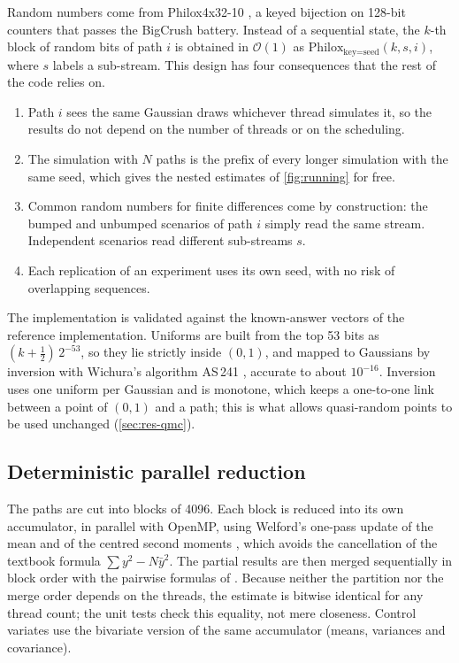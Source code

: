 \documentclass[11pt,a4paper]{article}
\newcommand{\1}{\mathbf{1}}
\theoremstyle{plain}
\theoremstyle{remark}
\begin{document}
Random numbers come from Philox4x32-10 \citep{salmon2011}, a keyed bijection on 128-bit counters that passes the
BigCrush battery. Instead of a sequential state, the $k$-th block of random bits of path $i$ is obtained in
$\mathcal{O}(1)$ as $\mathrm{Philox}_{\text{key}=\text{seed}}(k, s, i)$, where $s$ labels a sub-stream. This
design has four consequences that the rest of the code relies on.
\begin{enumerate}[nosep]
  \item Path $i$ sees the same Gaussian draws whichever thread simulates it, so the results do not depend on the
        number of threads or on the scheduling.
  \item The simulation with $N$ paths is the prefix of every longer simulation with the same seed, which gives
        the nested estimates of \cref{fig:running} for free.
  \item Common random numbers for finite differences come by construction: the bumped and unbumped scenarios of
        path $i$ simply read the same stream. Independent scenarios read different sub-streams $s$.
  \item Each replication of an experiment uses its own seed, with no risk of overlapping sequences.
\end{enumerate}
The implementation is validated against the known-answer vectors of the reference implementation.
Uniforms are built from the top 53 bits as $(k + \frac12)\, 2^{-53}$, so they lie strictly inside $(0,1)$, and
mapped to Gaussians by inversion with Wichura's algorithm AS\,241 \citep{wichura1988}, accurate to about
$10^{-16}$. Inversion uses one uniform per Gaussian and is monotone, which keeps a one-to-one link between a
point of $(0,1)$ and a path; this is what allows quasi-random points to be used unchanged (\cref{sec:res-qmc}).

\subsection{Deterministic parallel reduction}

The paths are cut into blocks of 4096. Each block is reduced into its own accumulator, in parallel with OpenMP,
using Welford's one-pass update of the mean and of the centred second moments \citep{welford1962}, which avoids
the cancellation of the textbook formula $\sum y^2 - N\bar y^2$. The partial results are then merged
sequentially in block order with the pairwise formulas of \citet{chan1983}. Because neither the partition nor
the merge order depends on the threads, the estimate is bitwise identical for any thread count; the unit tests
check this equality, not mere closeness. Control variates use the bivariate version of the same accumulator
(means, variances and covariance).
\end{document}
